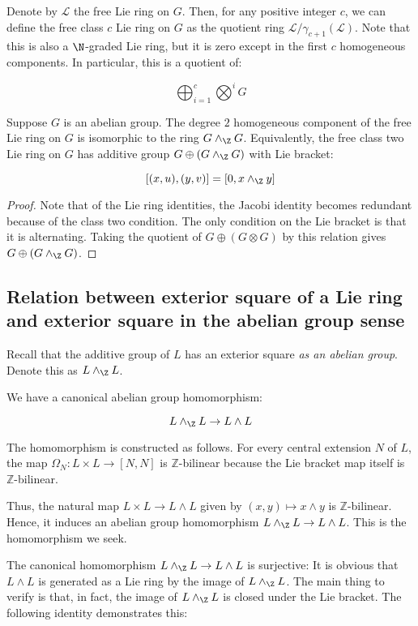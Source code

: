 \documentclass{ucetd}
\begin{document}
Denote by $\mathcal{L}$ the free Lie ring on $G$. Then, for any
positive integer $c$, we can define the free class $c$ Lie ring on $G$
as the quotient ring $\mathcal{L}/\gamma_{c+1}(\mathcal{L})$. Note that this is
also a $\N$-graded Lie ring, but it is zero except in the first $c$
homogeneous components. In particular, this is a quotient of:

$$\bigoplus_{i=1}^c \bigotimes^i G$$

\begin{lemma}
  Suppose $G$ is an abelian group. The degree $2$ homogeneous
  component of the free Lie ring on $G$ is isomorphic to the ring $G
  \wedge_\Z G$. Equivalently, the free class two Lie ring on $G$ has
  additive group $G \oplus (G \wedge_\Z G)$ with Lie bracket:

  $$[(x,u),(y,v)] = [0,x \wedge_\Z y]$$
\end{lemma}

\begin{proof}
  Note that of the Lie ring identities, the Jacobi identity becomes
  redundant because of the class two condition. The only condition on
  the Lie bracket is that it is alternating. Taking the quotient of $G
  \oplus (G \otimes G)$ by this relation gives $G \oplus (G \wedge_\Z
  G)$.
\end{proof}

\subsection{Relation between exterior square of a Lie ring and exterior square in the abelian group sense}\label{sec:exteriorsquare-abelian-lie}

Recall that the additive group of $L$ has an exterior square {\em as
  an abelian group}. Denote this as $L \wedge_\Z L$.

We have a canonical abelian group homomorphism:

$$L \wedge_\Z L \to L \wedge L$$

The homomorphism is constructed as follows. For every central
extension $N$ of $L$, the map $\Omega_N:L \times L \to [N,N]$ is
$\mathbb{Z}$-bilinear because the Lie bracket map itself is
$\mathbb{Z}$-bilinear.

Thus, the natural map $L \times L \to L \wedge L$ given by $(x,y)
\mapsto x \wedge y$ is $\mathbb{Z}$-bilinear. Hence, it induces an
abelian group homomorphism $L \wedge_\Z L \to L \wedge L$. This is the
homomorphism we seek.

The canonical homomorphism $L \wedge_\Z L \to L \wedge L$ is
surjective: It is obvious that $L \wedge L$ is generated as a Lie ring
by the image of $L \wedge_\Z L$. The main thing to verify is that, in
fact, the image of $L \wedge_\Z L$ is closed under the Lie
bracket. The following identity demonstrates this:
\end{document}
